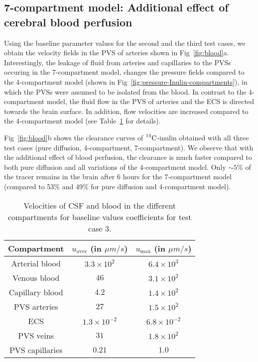 \documentclass[10pt]{article}
\newcommand{\1}{^{(1)}}
\newcommand{\2}{^{(2)}}
\newcommand{\Cinulin}{$\prescript{14}{}{\text{C}}$-inulin }
\begin{document}
\subsection{7-compartment model: Additional effect of cerebral blood perfusion}
Using the baseline parameter values for the second and the third test cases, we obtain the velocity fields in the PVS of arteries shown in Fig~\ref{fig:blood}a. Interestingly, the leakage of fluid from arteries and capillaries  to the PVSs  occuring in the 7-compartment model, changes the pressure fields compared to the 4-compartment model (shown in Fig~\ref{fig:pressure-Inulin-compartments}), in which the PVSs were assumed to be isolated from the blood. In contrast to the 4-compartment model, the fluid flow in the PVS of arteries and the ECS is directed towards the brain surface. In addition, flow velocities are increased compared to the 4-compartment model (see Table~\ref{tab:velocities-withblood} for details). 

Fig~\ref{fig:blood}b shows the clearance curves of \Cinulin obtained with all three test cases (pure diffusion, 4-compartment, 7-compartment). 
We observe that with the additional effect of blood perfusion, the clearance is much faster compared to both pure diffusion and all variations of the 4-compartment model. Only $\sim 5$\% of the tracer remains in the brain after 6 hours for the 7-compartment model (compared to 53\% and 49\% for pure diffusion and 4-compartment model). 

\begin{table}[h!]
    \centering
    \begin{tabular}{c|c|c}
       Compartment & $u_\text{aver}$ (in $\si{\mu m/s}$) & $u_\text{max}$ (in $\si{\mu m/s}$) \\
       \hline
        Arterial blood & $3.3 \times 10^2$ & $6.4 \times 10^3$\\
        Venous blood & $46$ & $3.1 \times 10^2$ \\
        Capillary blood & $4.2$ & $1.4 \times 10^2$\\
        PVS arteries & $27$ & $1.5 \times 10^2$ \\
        ECS &  $1.3 \times 10^{-2}$ & $6.8 \times 10^{-2} $ \\
        PVS veins & $31$ & $1.8\times 10^2$ \\
        PVS capillaries & $0.21$ & $1.0$
    \end{tabular}
    \caption{Velocities of CSF and blood in the different compartments for baseline values coefficients for test case 3.}
    \label{tab:velocities-withblood}
\end{table}
\end{document}
